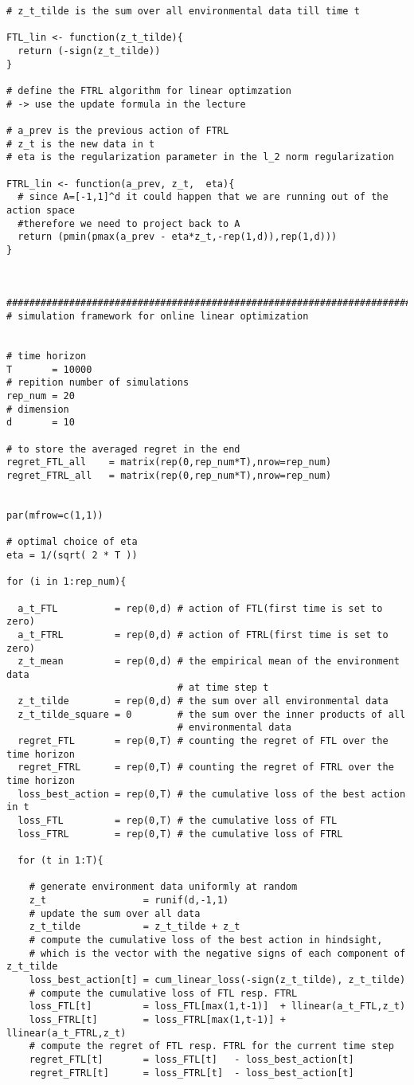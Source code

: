 \documentclass[a4paper]{article}
\begin{document}
{\begin{lstlisting}
# z_t_tilde is the sum over all environmental data till time t

FTL_lin <- function(z_t_tilde){
  return (-sign(z_t_tilde))
}

# define the FTRL algorithm for linear optimzation
# -> use the update formula in the lecture

# a_prev is the previous action of FTRL
# z_t is the new data in t  
# eta is the regularization parameter in the l_2 norm regularization

FTRL_lin <- function(a_prev, z_t,  eta){
  # since A=[-1,1]^d it could happen that we are running out of the action space
  #therefore we need to project back to A
  return (pmin(pmax(a_prev - eta*z_t,-rep(1,d)),rep(1,d)))
}



###############################################################################
# simulation framework for online linear optimization


# time horizon
T       = 10000
# repition number of simulations
rep_num = 20
# dimension
d       = 10

# to store the averaged regret in the end
regret_FTL_all    = matrix(rep(0,rep_num*T),nrow=rep_num)
regret_FTRL_all   = matrix(rep(0,rep_num*T),nrow=rep_num)


par(mfrow=c(1,1))

# optimal choice of eta
eta = 1/(sqrt( 2 * T ))

for (i in 1:rep_num){ 
  
  a_t_FTL          = rep(0,d) # action of FTL(first time is set to zero)
  a_t_FTRL         = rep(0,d) # action of FTRL(first time is set to zero)
  z_t_mean         = rep(0,d) # the empirical mean of the environment data 
                              # at time step t
  z_t_tilde        = rep(0,d) # the sum over all environmental data
  z_t_tilde_square = 0        # the sum over the inner products of all 
                              # environmental data
  regret_FTL       = rep(0,T) # counting the regret of FTL over the time horizon 
  regret_FTRL      = rep(0,T) # counting the regret of FTRL over the time horizon
  loss_best_action = rep(0,T) # the cumulative loss of the best action in t
  loss_FTL         = rep(0,T) # the cumulative loss of FTL 
  loss_FTRL        = rep(0,T) # the cumulative loss of FTRL 
  
  for (t in 1:T){
    
    # generate environment data uniformly at random
    z_t                 = runif(d,-1,1)
    # update the sum over all data
    z_t_tilde           = z_t_tilde + z_t
    # compute the cumulative loss of the best action in hindsight,
    # which is the vector with the negative signs of each component of z_t_tilde 
    loss_best_action[t] = cum_linear_loss(-sign(z_t_tilde), z_t_tilde)
    # compute the cumulative loss of FTL resp. FTRL
    loss_FTL[t]         = loss_FTL[max(1,t-1)]  + llinear(a_t_FTL,z_t)  
    loss_FTRL[t]        = loss_FTRL[max(1,t-1)] + llinear(a_t_FTRL,z_t)
    # compute the regret of FTL resp. FTRL for the current time step
    regret_FTL[t]       = loss_FTL[t]   - loss_best_action[t]
    regret_FTRL[t]      = loss_FTRL[t]  - loss_best_action[t]
    

\end{lstlisting}}
\end{document}
